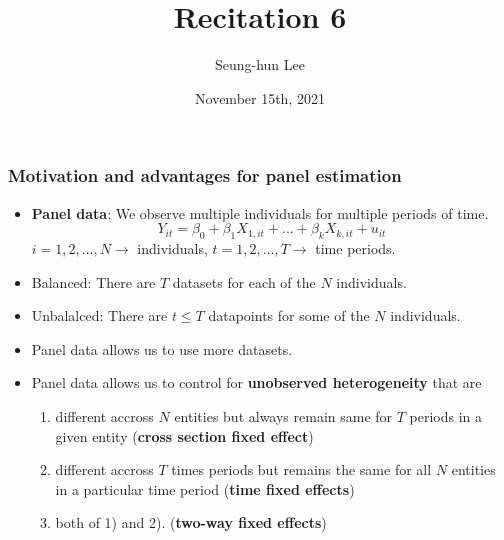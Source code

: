 \documentclass[aspectratio=169]{beamer}
\title[Recitation 6]{Recitation 6} %
\author[Seung-hun Lee]{Seung-hun Lee}
\institute[Columbia University]{Columbia University}
\date[November 15th, 2021]{November 15th, 2021}
\begin{document}
\begin{frame}
\titlepage
\end{frame}

\begin{frame}
\frametitle{Motivation and advantages for panel estimation}

\begin{itemize}
\item \textbf{Panel data}: We observe multiple individuals for multiple periods of time.
\[
Y_{it} = \beta_0 + \beta_1X_{1,it}+ ... +\beta_kX_{k,it}+u_{it}
\]
$i=1,2,...,N \to$  individuals, $t=1,2,...,T\to$  time periods.
\item Balanced: There are $T$ datasets for each of the $N$ individuals.
\item Unbalalced: There are $t\leq T$ datapoints for some of the $N$ individuals.
\end{itemize}


\begin{itemize}
\item Panel data allows us to use more datasets. 
\item Panel data allows us to control for \textbf{unobserved heterogeneity} that are
\begin{enumerate}
\item  different accross $N$ entities but always remain same for $T$ periods in a given entity (\textbf{cross section fixed effect})
\item different accross $T$ times periods but remains the same for all $N$ entities in a particular time period  (\textbf{time fixed effects})
\item both of 1) and 2). (\textbf{two-way fixed effects})
\end{enumerate}
\end{itemize}
\end{frame}
\end{document}
